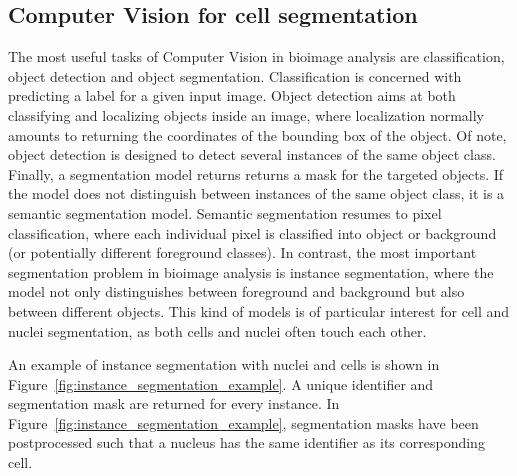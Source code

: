 \subsection{Computer Vision for cell segmentation}
\label{subsec:segmentation_instance_introduction}

The most useful tasks of Computer Vision in bioimage analysis are classification, object detection and object segmentation. 
Classification is concerned with predicting a label for a given input image. 
Object detection aims at both classifying and localizing objects inside an image, where localization normally amounts to returning the coordinates of the bounding box of the object. 
Of note, object detection is designed to detect several instances of the same object class. 
Finally, a segmentation model returns returns a mask for the targeted objects.
If the model does not distinguish between instances of the same object class, it is a semantic segmentation model. 
Semantic segmentation resumes to pixel classification, where each individual pixel is classified into object or background (or potentially different foreground classes). 
In contrast, the most important segmentation problem in bioimage analysis is instance segmentation, where the model not only distinguishes between foreground and background but also between different objects. This kind of models is of particular interest for cell and nuclei segmentation, as both cells and nuclei often touch each other. 

An example of instance segmentation with nuclei and cells is shown in Figure~\ref{fig:instance_segmentation_example}.
A unique identifier and segmentation mask are returned for every instance.
In Figure~\ref{fig:instance_segmentation_example}, segmentation masks have been postprocessed such that a nucleus has the same identifier as its corresponding cell.


